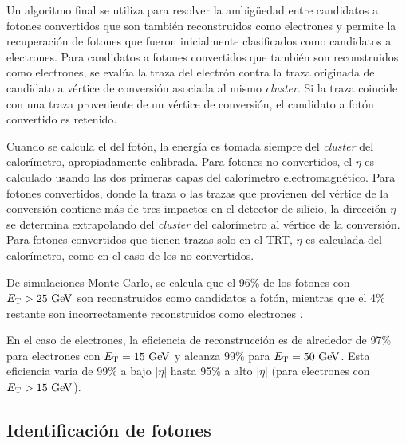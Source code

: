 Un algoritmo final \cite{Delmastro:1747242} se utiliza para resolver la
ambigüedad entre candidatos a fotones convertidos que son también reconstruidos
como electrones y permite la recuperación de fotones que fueron inicialmente
clasificados como candidatos a electrones.
Para candidatos a fotones convertidos que también son reconstruidos como
electrones, se evalúa la traza del electrón contra la traza originada del
candidato a vértice de conversión asociada al mismo \emph{cluster}. Si la traza
coincide con una traza proveniente de un vértice de conversión, el candidato a
fotón convertido es retenido.

Cuando se calcula el {\pt} del fotón, la energía es tomada siempre del \emph{cluster}
del calorímetro, apropiadamente calibrada\cite{Banfi:1259219}. Para fotones
no-convertidos, el $\eta$ es calculado usando las dos primeras capas del
calorímetro electromagnético. Para fotones convertidos, donde la traza o las
trazas que provienen del vértice de la conversión contiene más de tres impactos en
el detector de silicio, la dirección $\eta$ se determina extrapolando del
\emph{cluster} del calorímetro al vértice de la conversión. Para fotones convertidos
que tienen trazas solo en el TRT, $\eta$ es calculada del calorímetro, %
como en el caso de los no-convertidos.

De simulaciones Monte Carlo, se calcula que el 96\% de los fotones con
$\et>25\gev$ son reconstruidos como candidatos a fotón, mientras que el 4\%
restante son incorrectamente reconstruidos como electrones \cite{Delmastro:1747242}.

En el caso de electrones, la eficiencia de reconstrucción es de alrededor de
97\% para electrones con $\et=15 \gev$ y alcanza $99 \%$ para $\et=50\gev$. Esta
eficiencia varia de 99\% a bajo $|\eta|$ hasta 95\% a alto $|\eta|$ (para
electrones con $\et>15 \gev$)\cite{ATLAS-CONF-2014-032}.


\subsection{Identificación de fotones}
\label{sec:fotones}

